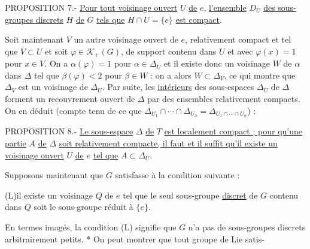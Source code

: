 PROPOSITION 7.- \uline{Pour tout voisinage ouvert} $U$ \uline{de} $e$, \uline{l'ensemble} $D_U$ \uline{des sous-groupes discrets} $H$ \uline{de} $G$ \uline{tels que} $H\cap U=\{e\}$ \uline{est compact}.

Soit maintenant $V$ un autre voisinage ouvert de $e$, relativement compact et tel que $\overline V\subset U$ et soit $\varphi\in\mathcal K_+(G)$, de support contenu dans $U$ et avec $\varphi(x)=1$ pour $x\in V$. On a $\alpha(\varphi)=1$ pour $\alpha\in\Delta_U$ et il existe donc un voisinage $W$ de $\alpha$ dans $\Delta$ tel que $\beta(\varphi)<2$ pour $\beta\in W$ : on a alors $W\subset\Delta_V$, ce qui montre que $\Delta_V$ est un voisinage de $\Delta_U$. Par suite, les \uline{intérieurs} des sous-espaces $\Delta_U$ de $\Delta$ forment un recouvrement ouvert de $\Delta$ par des ensembles relativement compacts. On en déduit (compte tenu de ce que $\Delta_{U_1}\cap\cdots\cap\Delta_{U_n}=\Delta_{U_1\cap\cdots\cap U_n}$) :

PROPOSITION 8.- \uline{Le sous-espace} $\Delta$ \uline{de} $T$ \uline{est localement compact ; pour qu'une partie} $A$ \uline{de} $\Delta$ \uline{soit relativement compacte, il faut et il suffit qu'il existe un voisinage ouvert} $U$ \uline{de} $e$ \uline{tel que} $A\subset\Delta_U$.

Supposons maintenant que $G$ satisfasse à la condition suivante :

(L)\qquad il existe un voisinage $Q$ de $e$ tel que le seul sous-groupe \uline{discret} de $G$ contenu dans $Q$ soit le sous-groupe réduit à $\{e\}$.

En termes imagés, la condition (L) signifie que $G$ n'a pas de sous-groupes discrets arbitrairement petits. * On peut montrer que tout groupe de Lie satis-


